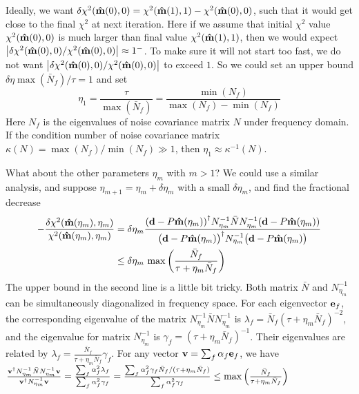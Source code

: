\documentclass[11pt, letterpaper]{article}
\newcommand{\vbd}{\vb{d}}
\newcommand{\inv}[1]{#1^{-1}}
\newcommand{\hatm}{\vb{\hat{m}}}
\newcommand{\Nbar}{\bar{N}}
\begin{document}
Ideally, we want
$\delta \chi^2(\hatm(0),0) = \chi^2(\hatm(1), 1) - \chi^2(\hatm(0),0)$,
such that it would get close to the final $\chi^2$ at next iteration.
Here if we assume that initial $\chi^2$ value $\chi^2(\hatm(0),0)$ is much
larger than final value $\chi^2(\hatm(1),1)$,
then we would expect
$\qty|\delta\chi^2(\hatm(0),0)/\chi^2(\hatm(0),0)| \approx 1^-$.
To make sure it will not start too fast, we do not want 
$\qty|\delta\chi^2(\hatm(0),0)/\chi^2(\hatm(0),0)|$ 
to exceed $1$.
So we could set an upper bound $\delta \eta \max(\Nbar_f) / \tau = 1$
and set
\begin{equation}
\eta_1 = \frac{\tau}{\max(\Nbar_f)} = \frac{\min(N_f)}{\max(N_f) - \min(N_f)}
\end{equation}
Here $N_f$ is the eigenvalues of noise covariance matrix $N$ under frequency
domain.
If the condition number of noise covariance matrix
$\kappa(N) = \max(N_f)/\min(N_f) \gg 1$,
then $\eta_1 \approx \inv{\kappa} (N)$.

What about the other parameters $\eta_m$ with $m > 1$?
We could use a similar analysis,
and suppose $\eta_{m+1} = \eta_m + \delta \eta_m$ with a small $\delta\eta_m$,
and find the fractional decrease
\begin{align}
\begin{aligned}[b]
-\frac{\delta \chi^2(\hatm(\eta_m), \eta_m)}{\chi^2(\hatm(\eta_m), \eta_m)}  
&= \delta\eta_m
\frac{\qty(\vbd - P\hatm(\eta_m))^{\dagger}
    \inv{N_{\eta_m}} \Nbar \inv{N_{\eta_m}}
    (\vbd - P\hatm(\eta_m))
}
{\qty\big(\vbd - P \hatm(\eta_m))^{\dagger}
    \inv{N_{\eta_m}}
    \qty\big(\vbd - P\hatm(\eta_m))
}
\\
& \leq \delta \eta_m\, \max\qty(\frac{\Nbar_f}{\tau + \eta_m \Nbar_f})
\label{eta upper bound}
\end{aligned}
\end{align}
The upper bound in the second line is a little bit tricky.
Both matrix $\Nbar$ and $\inv{N}_{\eta_m}$ 
can be simultaneously diagonalized in frequency space.
For each eigenvector $\vb{e}_f$,
the corresponding eigenvalue of the matrix 
$\inv{N}_{\eta_m} \Nbar \inv{N}_{\eta_m}$
is
$\lambda_f = \Nbar_f (\tau + \eta_m \Nbar_f)^{-2}$,
and the eigenvalue for matrix 
$\inv{N}_{\eta_m}$
is
$\gamma_f = (\tau + \eta_m \Nbar_f)^{-1}$.
Their eigenvalues are related by
$\lambda_f = \frac{\Nbar_f}{\tau + \eta_m \Nbar_f} \gamma_f$.
For any vector $\vb{v} = \sum_f \alpha_f \vb{e}_f$, we have
$\frac{\vb{v}^{\dagger} \inv{N}_{\eta_m} \Nbar \inv{N}_{\eta_m} \vb{v}}
{\vb{v}^{\dagger} \inv{N}_{\eta_m} \vb{v}}
= \frac{\sum_f \alpha_f^2 \lambda_f}{\sum_f \alpha_f^2 \gamma_f}
= \frac{\sum_f \alpha_f^2 \gamma_f \Nbar_f/(\tau + \eta_m \Nbar_f)}
{\sum_f \alpha_f^2 \gamma_f}
\leq \max \qty( \frac{\Nbar_f}{\tau + \eta_m \Nbar_f})
$
\end{document}

